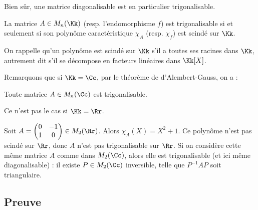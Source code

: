 \documentclass[12pt, class=report,crop=false]{standalone}
\begin{document}
Bien sûr, une matrice diagonalisable est en particulier trigonalisable.

\begin{theoreme}
La matrice $A \in M_n(\Kk)$ (resp. l'endomorphisme $f$) est trigonalisable si et seulement 
si son polynôme caractéristique $\chi_A$ (resp. $\chi_f$) est scindé sur $\Kk$.
\end{theoreme} 

On rappelle qu'un polynôme est scindé sur $\Kk$ s'il a toutes ses racines dans $\Kk$, autrement dit s'il se décompose en facteurs linéaires dans $\Kk[X]$.

Remarquons que si $\Kk=\Cc$, par le théorème de d'Alembert-Gauss, on a : 
\begin{corollaire}
Toute matrice $A \in M_n(\Cc)$ est trigonalisable.
\end{corollaire}

Ce n'est pas le cas si $\Kk=\Rr$.
\begin{exemple}
Soit $A = 
\begin{pmatrix}
0&-1\\
1&0
\end{pmatrix} \in M_2(\Rr)$.
Alors $\chi_A(X) = X^2+1$. Ce polynôme n'est pas scindé sur $\Rr$, donc $A$ n'est pas trigonalisable sur $\Rr$. Si on considère cette même matrice $A$ comme dans $M_2(\Cc)$, alors elle est trigonalisable (et ici même diagonalisable) : il existe $P \in M_2(\Cc)$ inversible, telle que $P^{-1}AP$ soit triangulaire. 
\end{exemple}



\subsection{Preuve}
\end{document}
